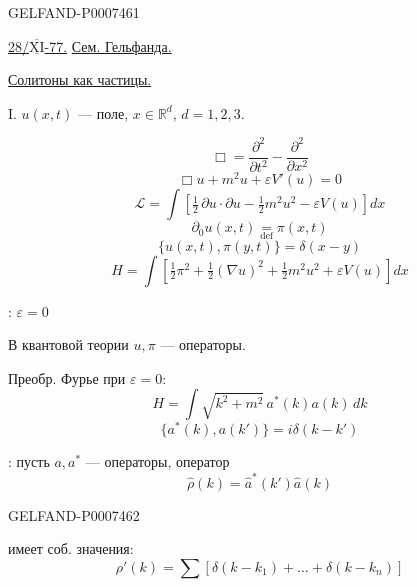 \begin{GelfandAdjacentEvidence}{GELFAND-P000746}{1}

\underline{28/\(\overline{\underline{\mathrm{XI}}}\)-77.}\qquad
\underline{Сем. Гельфанда.}

\qquad
\underline{Солитоны как частицы.}

I. \(u(x,t)\) --- поле, \(x\in\mathbb R^d\), \(d=1,2,3\).

\[
\Box=\frac{\partial^2}{\partial t^2}-\frac{\partial^2}{\partial x^2}
\]
\begin{equation*}
\Box u+m^2u+\varepsilon V'(u)=0
\tag{1}
\end{equation*}
\begin{equation*}
\mathcal L=\int\left[\tfrac12\,\partial u\cdot\partial u
-\tfrac12 m^2u^2-\varepsilon V(u)\right]dx
\tag{2}
\end{equation*}
\[
\partial_0u(x,t)\underset{\mathrm{def}}{=}\pi(x,t)
\]
\begin{equation*}
\{u(x,t),\pi(y,t)\}=\delta(x-y)
\tag{3}
\end{equation*}
\begin{equation*}
H=\int\left[\tfrac12\pi^2+\tfrac12(\nabla u)^2
+\tfrac12m^2u^2+\varepsilon V(u)\right]dx
\tag{4}
\end{equation*}

: \(\varepsilon=0\)

В квантовой теории \(u,\pi\) --- операторы.

Преобр. Фурье при \(\varepsilon=0\):
\begin{equation*}
H=\int\sqrt{k^2+m^2}\,a^*(k)a(k)\,dk
\tag{5}
\end{equation*}
\begin{equation*}
\{a^*(k),a(k')\}=i\delta(k-k')
\tag{6}
\end{equation*}

: пусть \(a,a^*\) --- операторы, оператор
\begin{equation*}
\hat\rho(k)=\hat a^*(k')\hat a(k)
\tag{7}
\end{equation*}
\end{GelfandAdjacentEvidence}
\begin{GelfandAdjacentEvidence}{GELFAND-P000746}{2}


имеет соб. значения:
\begin{equation*}
\rho'(k)=\sum\left[\delta(k-k_1)+\dots+\delta(k-k_n)\right]
\tag{8}
\end{equation*}
\end{GelfandAdjacentEvidence}


